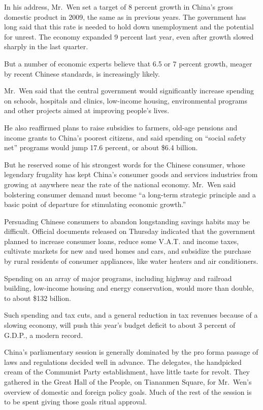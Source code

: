\documentclass[12pt,a4paper,onecolumn]{article}
\begin{document}
\begin{CJK*}{GBK}{song}
In his address, Mr.~Wen set a target of 8 percent growth in China's gross domestic product in 2009,
the same as in previous years. The government has long said that this rate is needed to hold down
unemployment and the potential for unrest. The economy expanded 9 percent last year, even after
growth slowed sharply in the last quarter.

But a number of economic experts believe that 6.5 or 7 percent growth, meager by recent Chinese
standards, is increasingly likely.

Mr.~Wen said that the central government would significantly increase spending on schools, hospitals
and clinics, low-income housing, environmental programs and other projects aimed at improving
people's lives.

He also reaffirmed plans to raise subsidies to farmers, old-age pensions and income grants to
China's poorest citizens, and said spending on ``social safety net'' programs would jump 17.6
percent, or about \$6.4 billion.

But he reserved some of his strongest words for the Chinese consumer, whose legendary frugality has
kept China's consumer goods and services industries from growing at anywhere near the rate of the
national economy. Mr.~Wen said bolstering consumer demand must become ``a long-term strategic
principle and a basic point of departure for stimulating economic growth.''

Persuading Chinese consumers to abandon longstanding savings habits may be difficult. Official
documents released on Thursday indicated that the government planned to increase consumer loans,
reduce some V.A.T. and income taxes, cultivate markets for new and used homes and cars, and
subsidize the purchase by rural residents of consumer appliances, like water heaters and air
conditioners.

Spending on an array of major programs, including highway and railroad building, low-income housing
and energy conservation, would more than double, to about \$132 billion.

Such spending and tax cuts, and a general reduction in tax revenues because of a slowing economy,
will push this year's budget deficit to about 3 percent of G.D.P., a modern record.

China's parliamentary session is generally dominated by the pro forma passage of laws and
regulations decided well in advance. The delegates, the handpicked cream of the Communist Party
establishment, have little taste for revolt. They gathered in the Great Hall of the People, on
Tiananmen Square, for Mr.~Wen's overview of domestic and foreign policy goals. Much of the rest of
the session is to be spent giving those goals ritual approval.


\end{CJK*}
\end{document}
